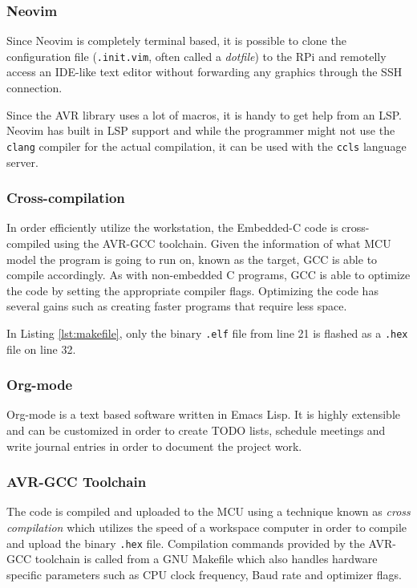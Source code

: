 \subsubsection{Neovim}%
\label{ssub:neovim}
Since Neovim is completely terminal based, it is possible to clone the configuration file (\verb|.init.vim|, often called a \textit{dotfile}) to the RPi and remotelly access an IDE-like text editor without forwarding any graphics through the SSH connection.

Since the AVR library uses a lot of macros, it is handy to get help from an LSP. Neovim has built in LSP support and while the programmer might not use the \verb|clang| compiler for the actual compilation, it can be used with the \verb|ccls| language server.



\subsubsection{Cross-compilation}%
\label{ssub:cross_compilation}
In order efficiently utilize the workstation, the Embedded-C code is cross-compiled using the AVR-GCC toolchain. Given the information of what MCU model the program is going to run on, known as the target, GCC is able to compile accordingly. As with non-embedded C programs, GCC is able to optimize the code by setting the appropriate compiler flags. Optimizing the code has several gains such as creating faster programs that require less space.



In Listing \ref{lst:makefile}, only the binary \verb|.elf| file from line 21 is flashed as a \verb|.hex| file on line 32. 

\subsubsection{Org-mode}%
\label{ssub:org_mode}
Org-mode is a text based software written in Emacs Lisp. It is highly extensible and can be customized in order to create TODO lists, schedule meetings and write journal entries in order to document the project work.

\subsubsection{AVR-GCC Toolchain}%
\label{ssub:avr_gcc_toolchain}
The code is compiled and uploaded to the MCU using a technique known as \textit{cross compilation} which utilizes the speed of a workspace computer in order to compile and upload the binary \verb|.hex| file. Compilation commands provided by the AVR-GCC toolchain is called from a GNU Makefile which also handles hardware specific parameters such as CPU clock frequency, Baud rate and optimizer flags. 

